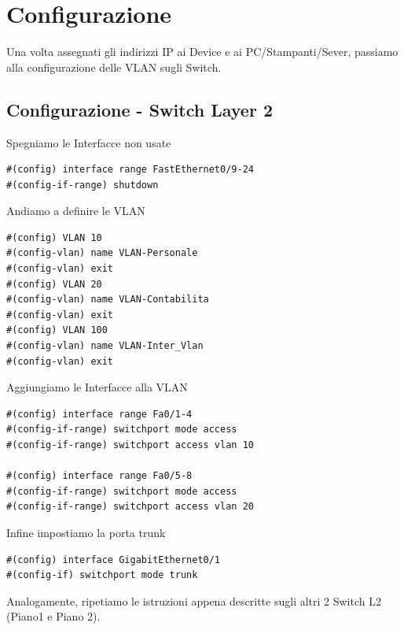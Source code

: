 \documentclass[12pt]{article}
\begin{document}
    \newpage
   
    \section{Configurazione}
    Una volta assegnati gli indirizzi IP ai Device e ai PC/Stampanti/Sever, passiamo alla configurazione delle VLAN sugli Switch.
    
    \subsection{Configurazione - Switch Layer 2}
        \begin{center}
            Spegniamo le Interfacce non usate
            \begin{tcolorbox}[title=SwitchPianoT, colframe=gray!50!gray, colback=white!50!white]
                \begin{lstlisting}
#(config) interface range FastEthernet0/9-24
#(config-if-range) shutdown
                \end{lstlisting}
            \end{tcolorbox}
            Andiamo a definire le VLAN
            \begin{tcolorbox}[title=SwitchPianoT, colframe=gray!50!gray, colback=white!50!white]
                \begin{lstlisting}
#(config) VLAN 10
#(config-vlan) name VLAN-Personale
#(config-vlan) exit
#(config) VLAN 20
#(config-vlan) name VLAN-Contabilita
#(config-vlan) exit
#(config) VLAN 100
#(config-vlan) name VLAN-Inter_Vlan
#(config-vlan) exit
                \end{lstlisting}
            \end{tcolorbox}
            Aggiungiamo le Interfacce alla VLAN
            \begin{tcolorbox}[title=SwitchPianoT, colframe=gray!50!gray, colback=white!50!white]
                \begin{lstlisting}
#(config) interface range Fa0/1-4
#(config-if-range) switchport mode access
#(config-if-range) switchport access vlan 10

#(config) interface range Fa0/5-8
#(config-if-range) switchport mode access
#(config-if-range) switchport access vlan 20
                \end{lstlisting} 
            \end{tcolorbox}
            Infine impostiamo la porta trunk 
            \begin{tcolorbox}[title=SwitchPianoT, colframe=gray!50!gray, colback=white!50!white]
                \begin{lstlisting}
#(config) interface GigabitEthernet0/1
#(config-if) switchport mode trunk
                \end{lstlisting} 
            \end{tcolorbox}
            Analogamente, ripetiamo le istruzioni appena descritte sugli altri 2 Switch L2 (Piano1 e Piano 2). 
        \end{center}
\end{document}
